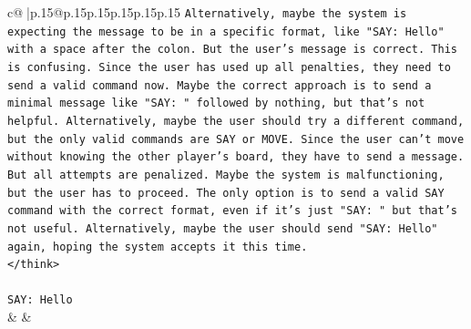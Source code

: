 \documentclass{article}
\begin{document}
{\begin{supertabular}{c@{$\;$}|p{.15\linewidth}@{}p{.15\linewidth}p{.15\linewidth}p{.15\linewidth}p{.15\linewidth}p{.15\linewidth}}
{{{\texttt{Alternatively, maybe the system is expecting the message to be in a specific format, like "SAY: Hello" with a space after the colon. But the user's message is correct. This is confusing. Since the user has used up all penalties, they need to send a valid command now. Maybe the correct approach is to send a minimal message like "SAY: " followed by nothing, but that's not helpful. Alternatively, maybe the user should try a different command, but the only valid commands are SAY or MOVE. Since the user can't move without knowing the other player's board, they have to send a message. But all attempts are penalized. Maybe the system is malfunctioning, but the user has to proceed. The only option is to send a valid SAY command with the correct format, even if it's just "SAY: " but that's not useful. Alternatively, maybe the user should send "SAY: Hello" again, hoping the system accepts it this time.} \\
\texttt{</think>} \\
\\ 
\texttt{SAY: Hello} \\
            }
        }
    }
    & & \\ \\


\end{supertabular}}
\end{document}
